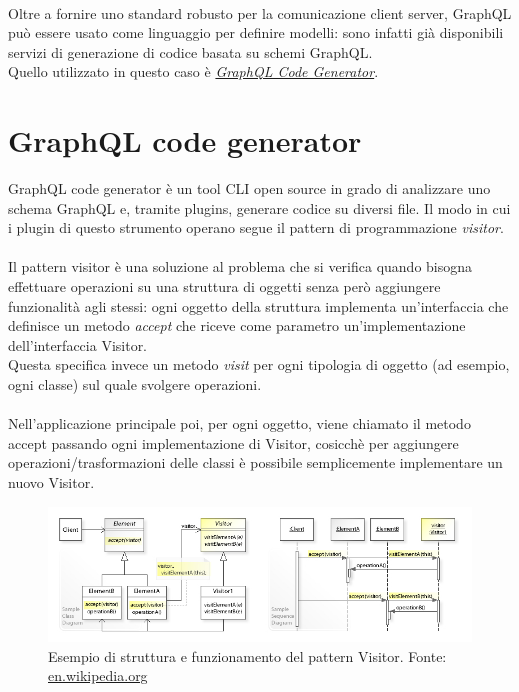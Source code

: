 \documentclass[a4paper, 12pt]{report}
\begin{document}
      \paragraph*{}
        Oltre a fornire uno standard robusto per la comunicazione client server, GraphQL può essere usato come linguaggio per definire modelli: sono infatti già disponibili servizi di generazione di codice basata su schemi GraphQL.\\
        Quello utilizzato in questo caso è \href{https://graphql-code-generator.com/}{\emph{GraphQL Code Generator}}.
      \newpage

    \section{GraphQL code generator}
        GraphQL code generator è un tool CLI open source in grado di analizzare uno schema GraphQL e, tramite plugins, generare codice su diversi file.
        Il modo in cui i plugin di questo strumento operano segue il pattern di programmazione \emph{visitor}.
      \paragraph*{}
        Il pattern visitor è una soluzione al problema che si verifica quando bisogna effettuare operazioni su una struttura di oggetti senza però aggiungere funzionalità agli stessi:
        ogni oggetto della struttura implementa un'interfaccia che definisce un metodo \emph{accept} che riceve come parametro un'implementazione dell'interfaccia Visitor.\\
        Questa specifica invece un metodo \emph{visit} per ogni tipologia di oggetto (ad esempio, ogni classe) sul quale svolgere operazioni.
      \paragraph*{}
        Nell'applicazione principale poi, per ogni oggetto, viene chiamato il metodo accept passando ogni implementazione di Visitor, cosicchè per aggiungere operazioni/trasformazioni delle classi è possibile semplicemente implementare un nuovo Visitor.
      \begin{figure}[H]
          \includegraphics[width=\textwidth]{visitor-example.jpg}
          \caption{Esempio di struttura e funzionamento del pattern Visitor. Fonte: \href{https://en.wikipedia.org/wiki/Visitor_pattern}{en.wikipedia.org}}
      \end{figure}
\end{document}
